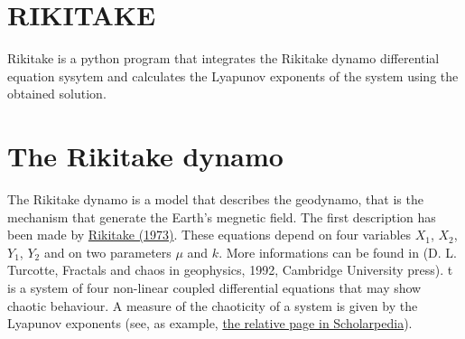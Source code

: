 \documentclass[a4paper, 11pt]{article}
\begin{document}
\section*{RIKITAKE}
Rikitake is a python program that integrates the Rikitake dynamo
differential equation sysytem and calculates the Lyapunov exponents of
the system using the obtained solution.
\section*{The Rikitake dynamo}
The Rikitake dynamo is a model that describes the geodynamo, that is the
mechanism that generate the Earth's megnetic field. The first description has been made by \href{https://academic.oup.com/gji/article/35/1-3/277/615502}{Rikitake (1973)}. These equations depend on four variables $X_1$, $X_2$, $Y_1$, $Y_2$ and on two parameters $\mu$ and $k$. More informations can be found in (D. L. Turcotte, Fractals and chaos in geophysics, 1992, Cambridge University press). t is a system of four non-linear coupled differential equations that may show chaotic behaviour. A measure of the chaoticity of a system is given by the Lyapunov exponents (see, as example, \href{http://www.scholarpedia.org/article/Lyapunov_exponent}{the relative page in Scholarpedia}). 
\end{document}
